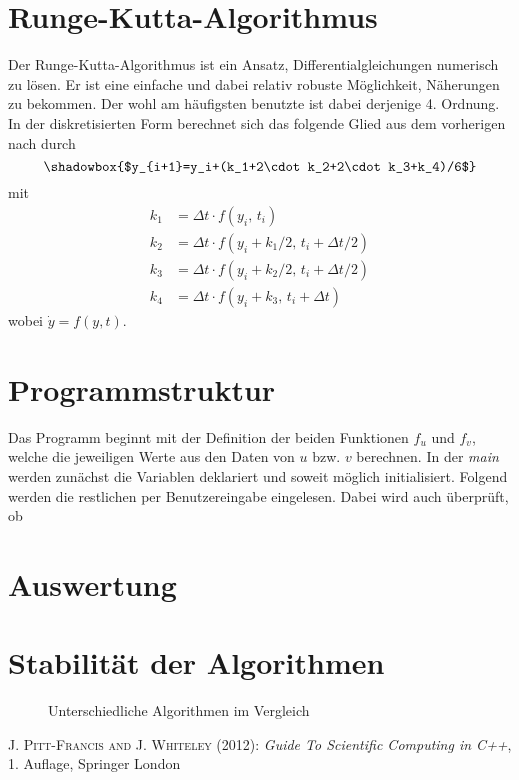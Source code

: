 \documentclass[12pt,a4paper,titlepage,headinclude,bibtotoc]{scrartcl}
\begin{document}
\section{Runge-Kutta-Algorithmus}
Der Runge-Kutta-Algorithmus ist ein Ansatz, Differentialgleichungen numerisch zu lösen.
Er ist eine einfache und dabei relativ robuste Möglichkeit, Näherungen zu bekommen.
Der wohl am häufigsten benutzte ist dabei derjenige 4. Ordnung.
In der diskretisierten Form berechnet sich das folgende Glied aus dem vorherigen nach \cite[S.130]{scientificcomp} durch
$$\shadowbox{$y_{i+1}=y_i+(k_1+2\cdot k_2+2\cdot k_3+k_4)/6$}$$ 
mit
\begin{align*}
k_1&=\Delta t\cdot f(y_i,\, t_i)\\
k_2&=\Delta t\cdot f(y_i+k_1/2,\, t_i+\Delta t/2)\\
k_3&=\Delta t\cdot f(y_i+k_2/2,\, t_i+\Delta t/2)\\
k_4&=\Delta t\cdot f(y_i+k_3,\, t_i+\Delta t)
\end{align*}
wobei $\dot y=f(y,t)$.

\section{Programmstruktur}
Das Programm beginnt mit der Definition der beiden Funktionen $f_u$ und $f_v$, welche die jeweiligen Werte  aus den Daten von $u$ bzw. $v$ berechnen.
In der \emph{main} werden zunächst die Variablen deklariert und soweit möglich initialisiert.
Folgend werden die restlichen per Benutzereingabe eingelesen. Dabei wird auch überprüft, ob 

\section{Auswertung}
\label{sec:auswertung}

\section{Stabilität der Algorithmen}
\begin{figure}[htb]
  \centering
   \hfill
   \caption{Unterschiedliche Algorithmen im Vergleich}
   \label{fig:label-gesamt}
 \end{figure}


\begin{thebibliography}{1000}

	\textsc{J. Pitt-Francis and J. Whiteley} (2012): \emph{Guide To Scientific Computing in C++},
	1. Auflage, Springer London

\end{thebibliography}
\end{document}
